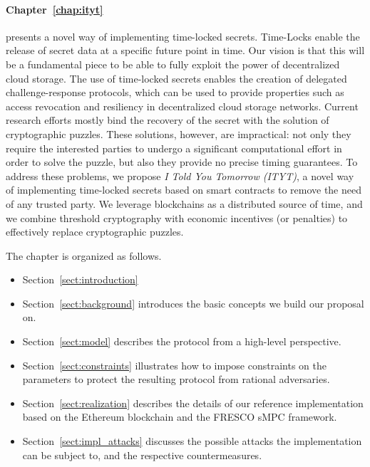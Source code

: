 {\paragraph*{Chapter~\ref{chap:ityt}} presents a novel way of implementing time-locked secrets. Time-Locks enable the release of secret data at a specific future point in time. Our vision is that this will be a fundamental piece to be able to fully exploit the power of decentralized cloud storage. The use of time-locked secrets enables the creation of delegated challenge-response protocols, which can be used to provide properties such as access revocation and resiliency in decentralized cloud storage networks.
%
Current research efforts mostly bind the recovery of the secret with the solution of cryptographic puzzles. These solutions, however, are  impractical: not only they require the interested parties to undergo a significant computational effort in order to solve the puzzle, but also they provide no precise timing guarantees.
%
To address these problems, we propose {\em I {\em Told} You Tomorrow (ITYT)}, a novel way of implementing time-locked secrets based on smart contracts to remove the need of any trusted party. We leverage blockchains as a distributed source of time, and we combine threshold cryptography with economic incentives (or penalties) to effectively replace cryptographic puzzles.

\smallskip

The chapter is organized as follows.

\begin{itemize}
	
\item Section~\ref{sect:introduction}
	
\item Section~\ref{sect:background} introduces the basic concepts we build our proposal on. 

\item Section~\ref{sect:model} describes the protocol from a high-level perspective.

\item Section~\ref{sect:constraints} illustrates how to impose constraints on the parameters to protect the resulting protocol from rational adversaries.

\item Section~\ref{sect:realization} describes the details of our reference implementation based on the Ethereum blockchain and the FRESCO sMPC framework.

\item Section~\ref{sect:impl_attacks} discusses the possible attacks the implementation can be subject to, and the respective countermeasures.


\end{itemize}}
